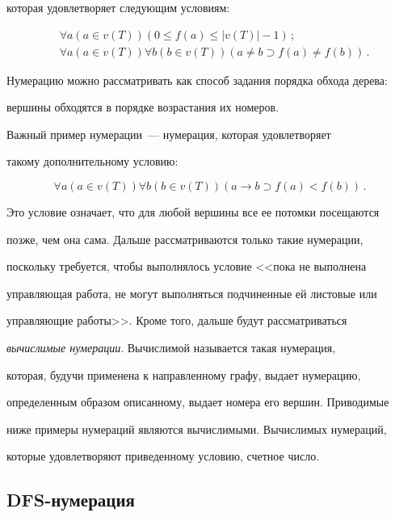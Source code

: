которая удовлетворяет следующим условиям:


      \begin{align*}


&      \forall a (a\in v(T)) (0\leq f(a)\leq |v(T)|-1)\,;\\


&      \forall a(a\in v(T))\forall b(b\in v(T)) (a\not= b \supset f(a) \not= f(b))\,.


      \end{align*}


Нумерацию можно рассматривать как способ задания порядка обхода дерева: 


вершины обходятся в порядке возрастания их номеров. 


      


      Важный пример нумерации~--- нумерация, которая удовлетворяет 


такому дополнительному условию:


      $$


      \forall a(a \in v(T)) \forall b(b\in v(T)) (a\rightarrow b \supset f(a)<f(b))\,.


      $$


Это условие означает, что для любой вершины все ее потомки посещаются 


позже, чем она сама. Дальше рассматриваются только  такие нумерации, 


поскольку требуется, чтобы выполнялось условие <<пока не выполнена 


управляющая работа, не могут выполняться подчиненные ей листовые или 


управляющие работы>>. Кроме того, дальше будут рассматриваться 


\textit{вычислимые  нумерации}. Вычислимой называется такая нумерация, 


которая, будучи применена к направленному графу, выдает нумерацию, 


определенным образом описанному, выдает номера его вершин. Приводимые 


ниже примеры нумераций являются вычислимыми. Вычислимых нумераций, 


которые удовлетворяют приведенному условию, счетное число. 





\subsection{DFS-нумерация}





